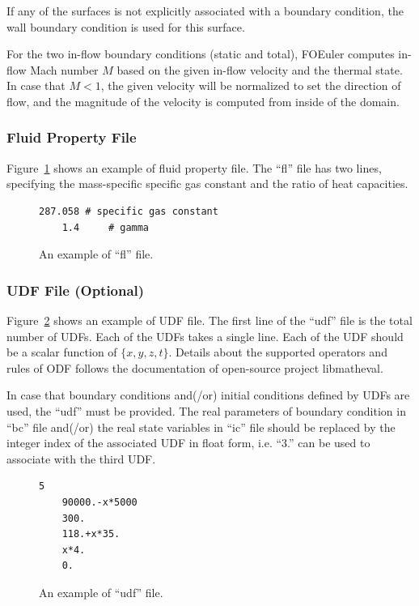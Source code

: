 \documentclass[]{article}
\begin{document}
If any of the surfaces is not explicitly associated with a boundary condition, the wall boundary
condition is used for this surface.

For the two in-flow boundary conditions (static and total), FOEuler computes in-flow Mach number $M$
based on the given in-flow velocity and the thermal state.
In case that $M<1$, the given velocity will be normalized to set the direction of flow, and the
magnitude of the velocity is computed from inside of the domain.

\subsubsection{Fluid Property File}

Figure~\ref{lst:fl} shows an example of fluid property file.
The ``fl'' file has two lines, specifying the mass-specific specific gas constant and the ratio of
heat capacities.

\begin{figure}[h!]
  \begin{lstlisting}[backgroundcolor=\color{lightgray}]
    287.058	# specific gas constant
    1.4		# gamma
  \end{lstlisting}
  \caption{An example of ``fl'' file.}
  \label{lst:fl}
\end{figure}

\subsubsection{UDF File (Optional)}

Figure~\ref{lst:udf} shows an example of UDF file.
The first line of the ``udf'' file is the total number of UDFs.
Each of the UDFs takes a single line.
Each of the UDF should be a scalar function of $\{x,y,z,t\}$.
Details about the supported operators and rules of ODF follows the documentation of open-source
project libmatheval.

In case that boundary conditions and(/or) initial conditions defined by UDFs are used, the ``udf''
must be provided.
The real parameters of boundary condition in ``bc'' file and(/or) the real state variables in ``ic''
file should be replaced by the integer index of the associated UDF in float form, i.e. ``3.'' can be
used to associate with the third UDF.

\begin{figure}[h!]
  \begin{lstlisting}[backgroundcolor=\color{lightgray}]
    5
    90000.-x*5000
    300.
    118.+x*35.
    x*4.
    0.
  \end{lstlisting}
  \caption{An example of ``udf'' file.}
  \label{lst:udf}
\end{figure}
\end{document}
